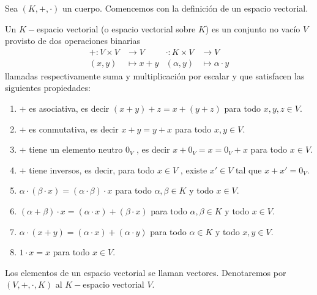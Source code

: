 Sea $(K, +, \cdot)$ un cuerpo. Comencemos con la definici\'on de un espacio vectorial.
\begin{defin}

Un $K-$espacio vectorial (o espacio vectorial sobre $K$) es un
conjunto no vac\'io $V$ provisto de dos operaciones binarias 
\begin{align*}
        + : V \times V &\to V &\cdot : K \times V &\to V\\
 (x, y) &\mapsto x + y&  (\alpha, y)& \mapsto \alpha \cdot y
\end{align*}
llamadas respectivamente suma y multiplicación por escalar y que satisfacen las siguientes propiedades:

\begin{enumerate}

\item
$+$ es asociativa, es decir $(x+ y)+ z = x+ (y+ z)$ para todo $x, y, z \in V$.

\item
$+$ es conmutativa, es decir $x + y = y + x$ para todo $x, y \in V$.

\item
$+$ tiene un elemento neutro $0_V$ , es decir $x + 0_V = x = 0_V + x$ para todo
$x \in V$.

\item
$+$ tiene inversos, es decir, para todo $x \in V$ , existe $x' \in V$ tal que $x + x' =0_V$.

\item
$\alpha \cdot  (\beta \cdot  x) = (\alpha \cdot \beta) \cdot  x$ para todo $\alpha , \beta \in K$ y todo $x \in V$.

\item
$(\alpha + \beta) \cdot x = (\alpha \cdot x) + (\beta \cdot x)$ para todo $\alpha,\beta \in K$ y todo $x \in V$.

\item
$\alpha \cdot (x + y) = (\alpha \cdot x) + (\alpha \cdot y)$ para todo $\alpha \in K$ y todo $x, y \in V$.

\item
$1 \cdot x = x$ para todo $x \in V$.
\end{enumerate}
\end{defin}
Los elementos de un espacio vectorial se llaman vectores.
Denotaremos por $(V,+,\cdot, K)$ al $K-$espacio vectorial $V$.



